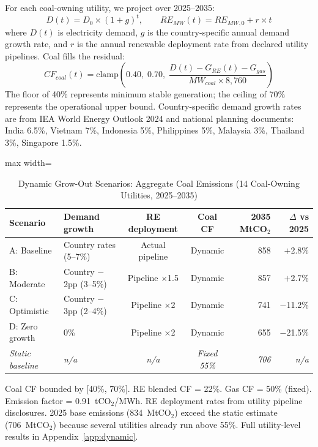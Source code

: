 \documentclass[review,3p,authoryear]{elsarticle}
\begin{document}
For each coal-owning utility, we project over 2025--2035:
\begin{equation}
D(t) = D_0 \times (1 + g)^t, \qquad RE_{MW}(t) = RE_{MW,0} + r \times t
\end{equation}
\noindent where $D(t)$ is electricity demand, $g$ is the country-specific annual demand growth rate, and $r$ is the annual renewable deployment rate from declared utility pipelines. Coal fills the residual:
\begin{equation}
CF_{coal}(t) = \text{clamp}\!\left(0.40,\; 0.70,\; \frac{D(t) - G_{RE}(t) - G_{gas}}{MW_{coal} \times 8{,}760}\right)
\end{equation}
\noindent The floor of 40\% represents minimum stable generation; the ceiling of 70\% represents the operational upper bound. Country-specific demand growth rates are from IEA World Energy Outlook 2024 and national planning documents: India 6.5\%, Vietnam 7\%, Indonesia 5\%, Philippines 5\%, Malaysia 3\%, Thailand 3\%, Singapore 1.5\%.

\begin{table}[H]
\centering
\caption{Dynamic Grow-Out Scenarios: Aggregate Coal Emissions (14 Coal-Owning Utilities, 2025--2035)}
\label{tab:dynamic}
\small
\begin{adjustbox}{max width=\linewidth}
\begin{tabular}{@{}llccrr@{}}
\toprule
\textbf{Scenario} & \textbf{Demand growth} & \textbf{RE deployment} & \textbf{Coal CF} & \textbf{2035 MtCO$_2$} & \textbf{$\Delta$ vs 2025} \\
\midrule
A: Baseline & Country rates (5--7\%) & Actual pipeline & Dynamic & 858 & $+$2.8\% \\
B: Moderate & Country $-$2pp (3--5\%) & Pipeline $\times$1.5 & Dynamic & 857 & $+$2.7\% \\
C: Optimistic & Country $-$3pp (2--4\%) & Pipeline $\times$2 & Dynamic & 741 & $-$11.2\% \\
D: Zero growth & 0\% & Pipeline $\times$2 & Dynamic & 655 & $-$21.5\% \\
\midrule
\textit{Static baseline} & \textit{n/a} & \textit{n/a} & \textit{Fixed 55\%} & \textit{706} & \textit{n/a} \\
\bottomrule
\end{tabular}
\end{adjustbox}
\begin{flushleft}
\footnotesize{Coal CF bounded by [40\%, 70\%]. RE blended CF = 22\%. Gas CF = 50\% (fixed). Emission factor = 0.91~tCO$_2$/MWh. RE deployment rates from utility pipeline disclosures. 2025 base emissions (834~MtCO$_2$) exceed the static estimate (706~MtCO$_2$) because several utilities already run above 55\%. Full utility-level results in Appendix~\ref{app:dynamic}.}
\end{flushleft}
\end{table}
\end{document}
